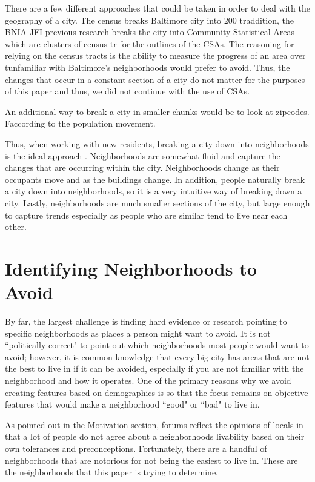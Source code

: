 \documentclass[conference]{IEEEtran}
\begin{document}
There are a few different approaches that could be taken in order to deal with the geography of a city.  The census breaks
Baltimore city into 200 traddition, the BNIA-JFI previous research breaks the city
into Community Statistical Areas which are clusters of census tr
for the outlines of the CSAs.  The reasoning for relying on the census tracts
is the ability to measure the progress of an area over tunfamiliar with Baltimore's neighborhoods would prefer to avoid.  Thus, the
changes that occur in a constant section of a city do not matter for the purposes of this paper and thus, we did not continue
with the use of CSAs.

An additional way to break a city in smaller chunks would be to look at zipcodes. Faccording to the population movement.

Thus, when working with new residents, breaking a city down into neighborhoods is the ideal approach .  Neighborhoods are somewhat
fluid and capture the changes that are occurring within the city.  Neighborhoods change as their occupants move and as
the buildings change.  In addition, people naturally break a city down into neighborhoods, so it is a very intuitive way
of breaking down a city.  Lastly, neighborhoods are much smaller sections of the city, but large enough to capture trends especially
as people who are similar tend to live near each other.


\section{Identifying Neighborhoods to Avoid}
By far, the largest challenge is finding hard evidence or research pointing to specific neighborhoods as places a person
might want to avoid.  It is not ``politically correct" to point out which neighborhoods most people would want to avoid;
however, it is common knowledge that every big city has areas that are not the best to live in if it can be avoided, especially
if you are not familiar with the neighborhood and how it operates.  One of the primary reasons why we avoid creating features
based on demographics is so that the focus remains on objective features that would make a neighborhood ``good" or ``bad" to live in.

As pointed out in the Motivation section, forums reflect the opinions of locals in that a lot of people do not agree about
a neighborhoods livability based on their own tolerances and preconceptions.
Fortunately, there are a handful of neighborhoods that are notorious for not being the easiest to live in.  These are the
neighborhoods that this paper is trying to determine.
\end{document}
